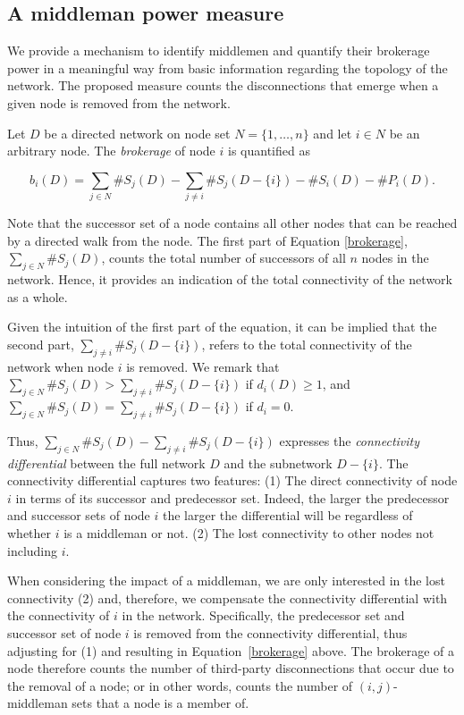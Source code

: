 \subsection{A middleman power measure}

We provide a mechanism to identify middlemen and quantify their brokerage power in a meaningful way from basic information regarding the topology of the network. The proposed measure counts the disconnections that emerge when a given node is removed from the network.

Let $D$ be a directed network on node set $N = \{1, \ldots ,n\}$ and let $i \in N$ be an arbitrary node. The \emph{brokerage} of node $i$ is quantified as

\begin{equation} \label{brokerage}
b_{i}(D) = \sum_{j \in N} \# S_{j}(D) - \sum_{j \neq i} \# S_{j}(D - \{i\}) - \#S_{i}(D) - \#P_{i}(D) .
\end{equation}

Note that the successor set of a node contains all other nodes that can be reached by a directed walk from the node. The first part of Equation \ref{brokerage}, $\sum_{j \in N} \# S_{j}(D)$, counts the total number of successors of all $n$ nodes in the network. Hence, it provides an indication of the total connectivity of the network as a whole.

Given the intuition of the first part of the equation, it can be implied that the second part, $\sum_{j \neq i} \# S_{j}(D - \{i\})$, refers to the total connectivity of the network when node $i$ is removed. We remark that $\sum_{j \in N} \# S_{j}(D) > \sum_{j \neq i} \# S_{j}(D - \{i\})$ if $d_{i}(D) \geqslant 1$, and $\sum_{j \in N} \# S_{j}(D) = \sum_{j \neq i} \# S_{j}(D - \{i\})$ if $d_{i} = 0$.

Thus, $\sum_{j \in N} \# S_{j}(D) - \sum_{j \neq i} \# S_{j}(D - \{i\})$ expresses the \emph{connectivity differential} between the full network $D$ and the subnetwork $D - \{i\}$. The connectivity differential captures two features: (1) The direct connectivity of node $i$ in terms of its successor and predecessor set. Indeed, the larger the predecessor and successor sets of node $i$ the larger the differential will be regardless of whether $i$ is a middleman or not. (2) The lost connectivity to other nodes not including $i$.

When considering the impact of a middleman, we are only interested in the lost connectivity (2) and, therefore, we compensate the connectivity differential with the connectivity of $i$ in the network. Specifically, the predecessor set and successor set of node $i$ is removed from the connectivity differential, thus adjusting for (1) and resulting in Equation~\ref{brokerage} above. The brokerage of a node therefore counts the number of third-party disconnections that occur due to the removal of a node; or in other words, counts the number of $(i,j)$-middleman sets that a node is a member of.

